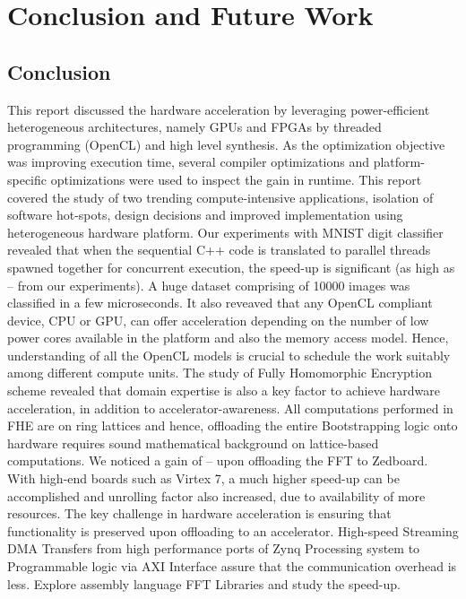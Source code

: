 \chapter{Conclusion and Future Work}
\label{ch5_conclusion}
\section{Conclusion}
\label{6_1}
This report discussed the hardware acceleration by leveraging power-efficient heterogeneous architectures, namely GPUs and FPGAs by threaded programming (OpenCL) and high level synthesis. As the optimization objective was improving execution time, several compiler optimizations and platform-specific optimizations were used to inspect the gain in runtime. This report covered the study of two trending compute-intensive applications, isolation of software hot-spots, design decisions and improved implementation using heterogeneous hardware platform. Our experiments with MNIST digit classifier revealed that when the sequential C++ code is translated to parallel threads spawned together for concurrent execution, the speed-up is significant (as high as -- from our experiments). A huge dataset comprising of 10000 images was classified in a few microseconds. It also reveaved that any OpenCL compliant device, CPU or GPU, can offer acceleration depending on the number of low power cores available in the platform and also the memory access model. Hence, understanding of all the OpenCL models is crucial to schedule the work suitably among different compute units. The study of Fully Homomorphic Encryption scheme revealed that domain expertise is also a key factor to achieve hardware acceleration, in addition to accelerator-awareness. All computations performed in FHE are on ring lattices and hence, offloading the entire Bootstrapping logic onto hardware requires sound mathematical background on lattice-based computations. We noticed a gain of -- upon offloading the FFT to Zedboard. With high-end boards such as Virtex 7, a much higher speed-up can be accomplished and unrolling factor also increased, due to availability of more resources. The key challenge in hardware acceleration is ensuring that functionality is preserved upon offloading to an accelerator. High-speed Streaming DMA Transfers from high performance ports of Zynq Processing system to Programmable logic via AXI Interface assure that the communication overhead is less.
Explore assembly language FFT Libraries and study the speed-up.

